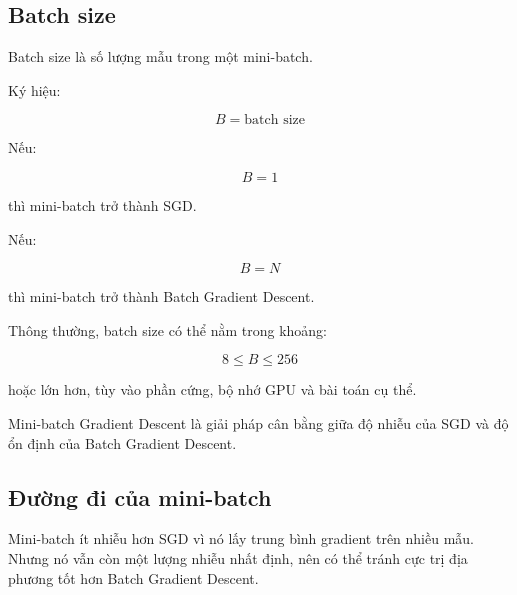 \subsection{Batch size}

Batch size là số lượng mẫu trong một mini-batch.

Ký hiệu:

\[
    B = \text{batch size}
\]

Nếu:

\[
    B=1
\]

thì mini-batch trở thành SGD.

Nếu:

\[
    B=N
\]

thì mini-batch trở thành Batch Gradient Descent.

Thông thường, batch size có thể nằm trong khoảng:

\[
    8 \leq B \leq 256
\]

hoặc lớn hơn, tùy vào phần cứng, bộ nhớ GPU và bài toán cụ thể.

\begin{ghinho}
Mini-batch Gradient Descent là giải pháp cân bằng giữa độ nhiễu của SGD và độ ổn định của Batch Gradient Descent.
\end{ghinho}

\subsection{Đường đi của mini-batch}

Mini-batch ít nhiễu hơn SGD vì nó lấy trung bình gradient trên nhiều mẫu. Nhưng nó vẫn còn một lượng nhiễu nhất định, nên có thể tránh cực trị địa phương tốt hơn Batch Gradient Descent.

\begin{center}
\end{center}

